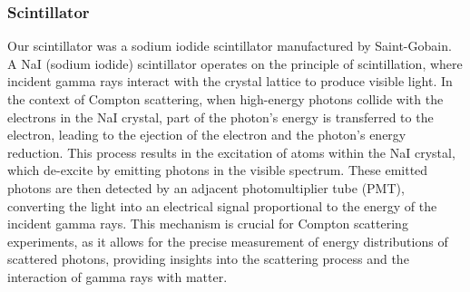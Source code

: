 \documentclass[10pt,letterpaper,onecolumn]{article}
\begin{document}
\subsubsection{Scintillator}
Our scintillator was a sodium iodide scintillator manufactured by Saint-Gobain. A NaI (sodium iodide) scintillator operates on the principle of scintillation, where incident gamma rays interact with the crystal lattice to produce visible light. In the context of Compton scattering, when high-energy photons collide with the electrons in the NaI crystal, part of the photon's energy is transferred to the electron, leading to the ejection of the electron and the photon's energy reduction. This process results in the excitation of atoms within the NaI crystal, which de-excite by emitting photons in the visible spectrum. These emitted photons are then detected by an adjacent photomultiplier tube (PMT), converting the light into an electrical signal proportional to the energy of the incident gamma rays. This mechanism is crucial for Compton scattering experiments, as it allows for the precise measurement of energy distributions of scattered photons, providing insights into the scattering process and the interaction of gamma rays with matter.
\end{document}
